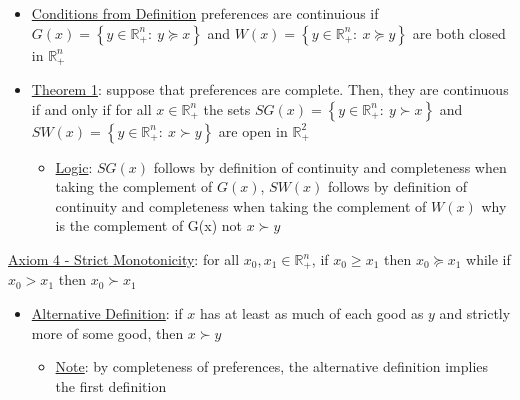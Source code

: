 \documentclass{article}
\begin{document}
  \begin{itemize}
    \item  \underline{Conditions from Definition} preferences are continuious if $G(x) = \left\{ y \in \mathbb{R}_{+}^{n}: \ y \succeq x \right\}$ and $W(x) = \left\{ y \in \mathbb{R}_{+}^{n}: \ x \succeq y \right\}$ are both closed in $\mathbb{R}_{+}^{n}$
    \item  \underline{Theorem 1}: suppose that preferences are complete. Then, they are continuous if and only if for all $x \in \mathbb{R}_{+}^{n}$ the sets $SG(x) = \left\{ y \in \mathbb{R}_{+}^{n}: \ y \succ x \right\}$ and $SW(x) = \left\{ y \in \mathbb{R}_{+}^{n}: \ x \succ y \right\}$ are open in $\mathbb{R}_{+}^{2}$
    \begin{itemize}
      \item  \underline{Logic}: $SG(x)$ follows by definition of continuity and completeness when taking the complement of $G(x)$, $SW(x)$ follows by definition of continuity and completeness when taking the complement of $W(x)$ \begingroup\color{magenta} why is the complement of G(x) not $x \succ y$ \endgroup
    \end{itemize}
  \end{itemize}
  \par
  \underline{Axiom 4 - Strict Monotonicity}: for all $x_{0}, x_{1} \in \mathbb{R}_{+}^{n}$, if $x_{0} \geq x_{1}$ then $x_{0} \succeq x_{1}$ while if $x_{0} > x_{1}$ then $x_{0} \succ x_{1}$
  \begin{itemize}
    \item  \underline{Alternative Definition}: if $x$ has at least as much of each good as $y$ and strictly more of some good, then $x \succ y$
    \begin{itemize}
      \item  \underline{Note}: by completeness of preferences, the alternative definition implies the first definition
    \end{itemize}
  \end{itemize}
  \par
\vspace{6mm}
\end{document}
